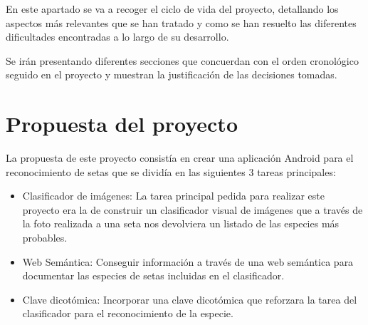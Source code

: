 

En este apartado se va a recoger el ciclo de vida del proyecto, detallando los aspectos más relevantes que se han tratado y como se han resuelto las diferentes  dificultades encontradas a lo largo de su desarrollo.

Se irán presentando diferentes secciones que concuerdan con el orden cronológico seguido en el proyecto y muestran la justificación de las decisiones tomadas.

\section{Propuesta del proyecto}

La propuesta de este proyecto consistía en crear una aplicación Android para el reconocimiento de setas que se dividía en las siguientes 3 tareas principales:

\begin{itemize}
	\item{Clasificador de imágenes:} La tarea principal pedida para realizar este proyecto era la de construir un clasificador visual de imágenes que a través de la foto realizada a una seta nos devolviera un listado de las especies más probables.
	\item{Web Semántica:} Conseguir información a través de una web semántica para documentar las especies de setas incluidas en el clasificador.
	\item{Clave dicotómica:} Incorporar una clave dicotómica que reforzara la tarea del clasificador para el reconocimiento de la especie.
\end{itemize}

